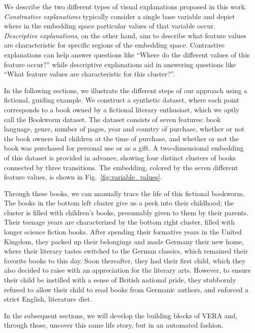 \documentclass[lettersize,journal]{IEEEtran}
\begin{document}
We describe the two different types of visual explanations proposed in this work.
\textit{Constrastive explanations} typically consider a single base variable and depict where in the embedding space particular values of that variable occur.
\textit{Descriptive explanations}, on the other hand, aim to describe what feature values are characteristic for specific regions of the embedding space.
Contrastive explanations can help answer questions like ``Where do the different values of this feature occur?'' while descriptive explanations aid in answering questions like ``What feature values are characteristic for this cluster?''.

In the following sections, we illustrate the different steps of our approach using a fictional, guiding example.
We construct a synthetic dataset, where each point corresponds to a book owned by a fictional literary enthusiast, which we aptly call the Bookworm dataset.
The dataset consists of seven features: book language, genre, number of pages, year and country of purchase, whether or not the book owners had children at the time of purchase, and whether or not the book was purchased for personal use or as a gift.
A two-dimensional embedding of this dataset is provided in advance, showing four distinct clusters of books connected by three transitions. The embedding, colored by the seven different feature values, is shown in Fig.~\ref{fig:variable_values}.

Through these books, we can manually trace the life of this fictional bookworm. The books in the bottom left cluster give us a peek into their childhood; the cluster is filled with children's books, presumably given to them by their parents. Their teenage years are characterized by the bottom right cluster, filled with longer science fiction books. After spending their formative years in the United Kingdom, they packed up their belongings and made Germany their new home, where their literary tastes switched to the German classics, which remained their favorite books to this day. Soon thereafter, they had their first child, which they also decided to raise with an appreciation for the literary arts. However, to ensure their child be instilled with a sense of British national pride, they stubbornly refused to allow their child to read books from Germanic authors, and enforced a strict English, literature diet.

In the subsequent sections, we will develop the building blocks of VERA and, through those, uncover this same life story, but in an automated fashion.
\end{document}
